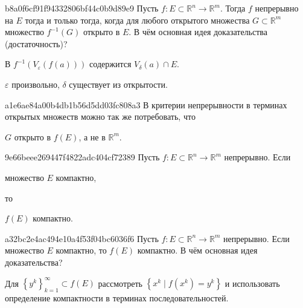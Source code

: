 \begin{note}{b8a0f6cf91f94332806bf44c0b9d89e9}
    Пусть \({ f : E \subset \mathbb R^{n} \to \mathbb R^{m} }\). Тогда  \({ f }\) непрерывно на \({ E }\)
    тогда и только тогда, когда
    для любого открытого множества \({ G \subset \mathbb R^{m} }\) множество \({ f^{-1}(G) }\) открыто в \({ E }\).
    В чём основная идея доказательства (достаточность)?

    \begin{cloze}{1}
        В \({ f^{-1}(V_\varepsilon(f(a))) }\) содержится \({ V_\delta(a) \cap E }\).
        \begin{center}
            \tiny
            \({ \varepsilon }\) произвольно, \({ \delta }\) существует из открытости.
        \end{center}
    \end{cloze}
\end{note}

\begin{note}{a1e6ae84a00b4db1b56d5dd03fc808a3}
    В критерии непрерывности в терминах открытых множеств можно так же потребовать, что \begin{icloze}{1}\({ G }\) открыто в \({ f(E) }\), а не в \({ \mathbb R^{m} }\).\end{icloze}
\end{note}

\begin{note}{9e66beee269447f4822adc404cf72389}
    Пусть \({ f : E \subset \mathbb R^{n} \to \mathbb R^{m} }\) непрерывно.
    Если \begin{icloze}{2}множество \({ E }\) компактно,\end{icloze} то \begin{icloze}{1}\({ f(E) }\) компактно.\end{icloze}
\end{note}

\begin{note}{a32bc2e4ac494e10a4f53f04bc6036f6}
    Пусть \({ f : E \subset \mathbb R^{n} \to \mathbb R^{m} }\) непрерывно.
    Если множество \({ E }\) компактно, то \({ f(E) }\) компактно.
    В чём основная идея доказательства?

    \begin{cloze}{1}
        Для \({ \left\{ y^{k} \right\}_{k = 1}^{\infty} \subset f(E) }\) рассмотреть \({ \left\{ x^{k} \mid f(x^{k}) = y^{k} \right\} }\) и использовать определение компактности в терминах последовательностей.
    \end{cloze}
\end{note}

